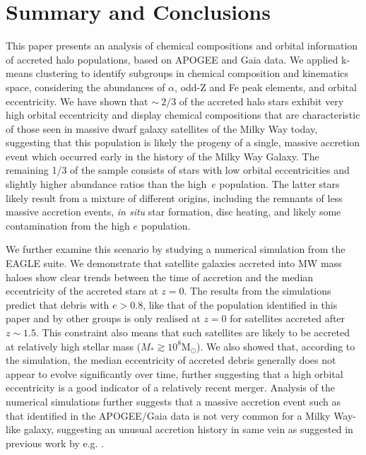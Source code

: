 \section{Summary and Conclusions} \label{finale}

This paper presents an analysis of chemical compositions and orbital
information of accreted halo populations, based on APOGEE and Gaia
data.  We applied k-means clustering to identify subgroups in
chemical composition and kinematics space, considering the abundances
of $\alpha$, odd-Z and Fe peak elements, and orbital eccentricity.
We have shown that $\sim~2/3$ of the accreted halo stars exhibit
very high orbital eccentricity and display chemical compositions
that are characteristic of those seen in massive dwarf galaxy
satellites of the Milky Way today, suggesting that this population
is likely the progeny of a single, massive accretion event which
occurred early in the history of the Milky Way Galaxy.  The remaining
1/3 of the sample consists of stars with low orbital eccentricities
and slightly higher abundance ratios than the high~$e$ population.
The latter stars likely result from a mixture of different origins,
including the remnants of less massive accretion events, {\it in
situ} star formation, disc heating, and likely some contamination
from the high $e$ population.

We further examine this scenario by studying a numerical simulation
from the EAGLE suite. We demonstrate that satellite galaxies accreted
into MW mass haloes show clear trends between the time of accretion
and the median eccentricity of the accreted stars at $z=0$. The
results from the simulations predict that debris with $e > 0.8$,
like that of the population identified in this paper and by other
groups
\citep[e.g.][]{2018MNRAS.475.1537M,2018arXiv180510288D,2018arXiv180606038H,2018MNRAS.478..611B}
is only realised at $z=0$ for satellites accreted after $z \sim
1.5$.  This constraint also means that such satellites are likely
to be accreted at  relatively high stellar mass ($M_*\gtrsim 10^{8}
\mathrm{M_{\odot}}$). We also showed that, according to the simulation,
the median eccentricity of accreted debris generally does not appear
to evolve significantly over time, further suggesting that a high
orbital eccentricity is a good indicator of a relatively recent
merger.  Analysis of the numerical simulations further suggests
that a massive accretion event such as that identified in the
APOGEE/Gaia data is not very common for a Milky Way-like galaxy,
suggesting an unusual accretion history in same vein as suggested
in previous work by e.g. \citet{2018MNRAS.477.5072M}.

